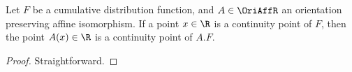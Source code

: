 \begin{lemma}
  \label{lem:cdf-continuity-pt-transform}
  \leanok
  Let $F$ be a cumulative distribution function,
  and $A \in \OriAffR$ an orientation preserving affine isomorphism.
  If a point $x \in \R$ is a continuity point of $F$, then
  the point $A(x) \in \R$ is a continuity point of $A.F$.
\end{lemma}
\begin{proof}
  \uses{}
  Straightforward.
\end{proof}


%
%

